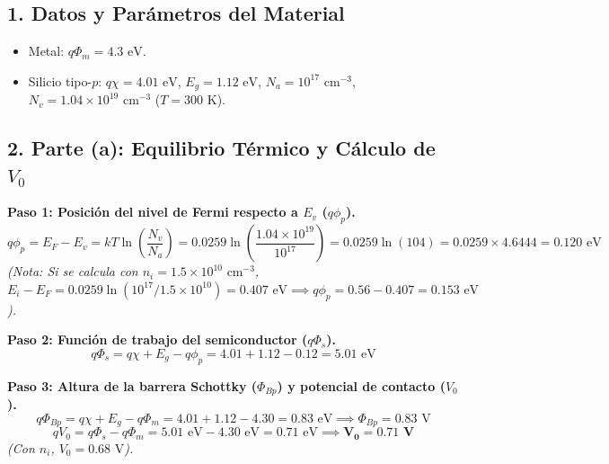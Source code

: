 \documentclass[11pt,a4paper]{article}
\begin{document}
\subsection*{1. Datos y Parámetros del Material}
\begin{itemize}
    \item Metal: $q\Phi_m = 4.3\text{ eV}$.
    \item Silicio tipo-$p$: $q\chi = 4.01\text{ eV}$, $E_g = 1.12\text{ eV}$, $N_a = 10^{17}\text{ cm}^{-3}$, $N_v = 1.04 \times 10^{19}\text{ cm}^{-3}$ ($T = 300\text{ K}$).
\end{itemize}

\subsection*{2. Parte (a): Equilibrio Térmico y Cálculo de $V_0$}
\textbf{Paso 1: Posición del nivel de Fermi respecto a $E_v$ ($q\phi_p$).}
\[
q\phi_p = E_F - E_v = kT \ln\left(\frac{N_v}{N_a}\right) = 0.0259 \ln\left(\frac{1.04 \times 10^{19}}{10^{17}}\right) = 0.0259 \ln(104) = 0.0259 \times 4.6444 = 0.120\text{ eV}
\]
\textit{(Nota: Si se calcula con $n_i = 1.5 \times 10^{10}\text{ cm}^{-3}$, $E_i - E_F = 0.0259\ln(10^{17}/1.5\times 10^{10}) = 0.407\text{ eV} \implies q\phi_p = 0.56 - 0.407 = 0.153\text{ eV}$).}

\textbf{Paso 2: Función de trabajo del semiconductor ($q\Phi_s$).}
\[
q\Phi_s = q\chi + E_g - q\phi_p = 4.01 + 1.12 - 0.12 = 5.01\text{ eV}
\]

\textbf{Paso 3: Altura de la barrera Schottky ($\Phi_{Bp}$) y potencial de contacto ($V_0$).}
\[
q\Phi_{Bp} = q\chi + E_g - q\Phi_m = 4.01 + 1.12 - 4.30 = 0.83\text{ eV} \implies \Phi_{Bp} = 0.83\text{ V}
\]
\[
qV_0 = q\Phi_s - q\Phi_m = 5.01\text{ eV} - 4.30\text{ eV} = 0.71\text{ eV} \implies \mathbf{V_0 = 0.71\text{ V}}
\]
\textit{(Con $n_i$, $V_0 = 0.68\text{ V}$).}
\end{document}
